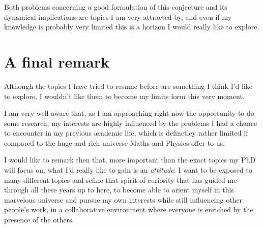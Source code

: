 \documentclass[12pt, a4paper]{article}
\begin{document}
Both problems concerning a good formulation of this conjecture and its dynamical implications are topics I am very attracted by, and even if my knowledge is probably very limited this is a horizon I would really like to explore.

	\section{A final remark}
Although the topics I have tried to resume before are something I think I'd like to  explore, I wouldn't like them to become my limits form this very moment. 

I am very well aware that, as I am approaching right now the opportunity to do some research, my interests are highly influenced by the problems I had a chance to encounter in my previous academic life, which is definetley rather limited if compared to the huge and rich universe Maths and Physics offer to us.

I would like to remark then that, more important than the exact topics my PhD will focus on, what I'd really like to gain is an \emph{attitude}: I want to be exposed to many different topics and refine that spirit of curiosity that has guided me through all these years up to here, to become able to orient myself in this marvelous universe and pursue my own interests while still influencing other people's work, in a collaborative environment where everyone is enriched by the presence of the others.

\clearpage


\printbibliography
\end{document}
